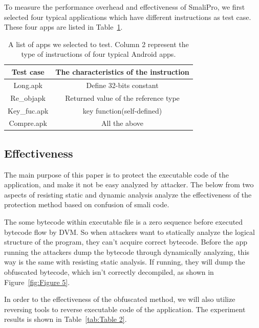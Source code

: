To measure the performance overhead and effectiveness of SmaliPro, we first selected four typical applications which have different instructions as test case. These four apps are listed in Table~\ref{tab:Table 1}.

\begin{table}[htbp]
  \centering
  \begin{tabular}{c c}
  \toprule
  Test case & The characteristics of the instruction\\
  \hline
  \hline
  Long.apk & Define 32-bits constant\\


  Re\_objapk & Returned value of the reference type\\


  Key\_fuc.apk & key function(self-defined)\\


  Compre.apk & All the above\\
  \bottomrule
  \end{tabular}
  \caption{A list of apps we selected to test. Column 2 represent the type of instructions of four typical Android apps. }\label{tab:Table 1}
\end{table}

\subsection{Effectiveness}
The main purpose of this paper is to protect the executable code of the application, and make it not be easy analyzed by attacker. The below from two aspects of resisting static and dynamic  analysis analyze the effectiveness of the protection method based on confusion of smali code.

The some bytecode within executable file is a zero sequence before executed bytecode flow by DVM. So when attackers want to statically analyze the logical structure of the program, they can't acquire correct bytecode. Before the app running the attackers dump the bytecode through dynamically analyzing, this way is the same with resisting static analysis. If running, they will dump the obfuscated bytecode, which isn't correctly decompiled, as shown in Figure~\ref{fig:Figure 5}.

In order to the effectiveness of the obfuscated method, we will also utilize reversing tools to reverse executable code of the application. The experiment results is shown in Table~\ref{tab:Table 2}.


